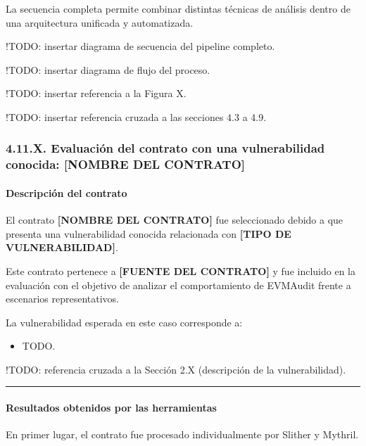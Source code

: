 La secuencia completa permite combinar distintas técnicas de análisis
dentro de una arquitectura unificada y automatizada.

!TODO: insertar diagrama de secuencia del pipeline completo.

!TODO: insertar diagrama de flujo del proceso.

!TODO: insertar referencia a la Figura X.

!TODO: insertar referencia cruzada a las secciones 4.3 a 4.9.

\subsubsection{4.11.X. Evaluación del contrato con una vulnerabilidad
conocida: {[}NOMBRE DEL
CONTRATO{]}}\label{x.-evaluaciuxf3n-del-contrato-con-una-vulnerabilidad-conocida-nombre-del-contrato}

\paragraph{Descripción del contrato}\label{descripciuxf3n-del-contrato}

El contrato \textbf{{[}NOMBRE DEL CONTRATO{]}} fue seleccionado debido a
que presenta una vulnerabilidad conocida relacionada con \textbf{{[}TIPO
DE VULNERABILIDAD{]}}.

Este contrato pertenece a \textbf{{[}FUENTE DEL CONTRATO{]}} y fue
incluido en la evaluación con el objetivo de analizar el comportamiento
de EVMAudit frente a escenarios representativos.

La vulnerabilidad esperada en este caso corresponde a:

\begin{itemize}
\tightlist
\item
  TODO.
\end{itemize}

!TODO: referencia cruzada a la Sección 2.X (descripción de la
vulnerabilidad).

\begin{center}\rule{0.5\linewidth}{0.5pt}\end{center}

\paragraph{Resultados obtenidos por las
herramientas}\label{resultados-obtenidos-por-las-herramientas}

En primer lugar, el contrato fue procesado individualmente por Slither y
Mythril.

